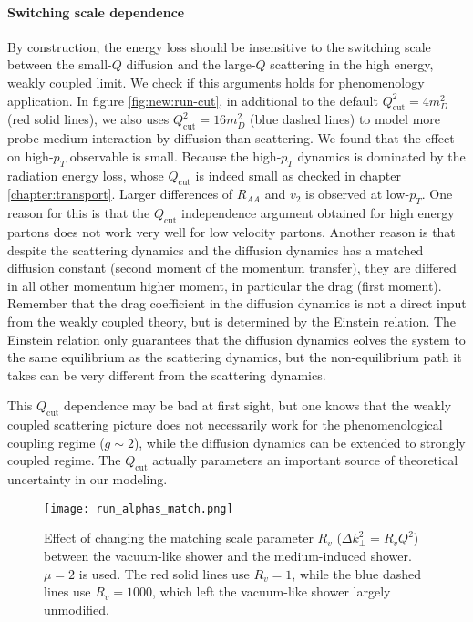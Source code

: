 \paragraph{Switching scale dependence} By construction, the energy loss should be insensitive to the switching scale between the small-$Q$ diffusion and the large-$Q$ scattering in the high energy, weakly coupled limit.
We check if this arguments holds for phenomenology application.
In figure \ref{fig:new:run-cut}, in additional to the default $Q_\textrm{cut}^2 = 4 m_D^2$ (red solid lines), we also uses $Q_\textrm{cut}^2 = 16 m_D^2$ (blue dashed lines) to model more probe-medium interaction by diffusion than scattering.
We found that the effect on high-$p_T$ observable is small.
Because the high-$p_T$ dynamics is dominated by the radiation energy loss, whose $Q_\textrm{cut}$ is indeed small as checked in chapter \ref{chapter:transport}.
Larger differences of $R_{AA}$ and $v_2$ is observed at low-$p_T$.
One reason for this is that the $Q_\textrm{cut}$ independence argument obtained for high energy partons does not work very well for low velocity partons.
Another reason is that despite the scattering dynamics and the diffusion dynamics has a matched diffusion constant (second moment of the momentum transfer), they are differed in all other momentum higher moment, in particular the drag (first moment).
Remember that the drag coefficient in the diffusion dynamics is not a direct input from the weakly coupled theory, but is determined by the Einstein relation.
The Einstein relation only guarantees that the diffusion dynamics eolves the system to the same equilibrium as the scattering dynamics, but the non-equilibrium path it takes can be very different from the scattering dynamics.

This $Q_\textrm{cut}$ dependence may be bad at first sight, but one knows that the weakly coupled scattering picture does not necessarily work for the phenomenological coupling regime ($g\sim 2$), while the diffusion dynamics can be extended to strongly coupled regime.
The $Q_\textrm{cut}$ actually parameters an important source of theoretical uncertainty in our modeling.

\begin{figure}
\centering
\texttt{[image: run\_alphas\_match.png]}
\caption{Effect of changing the matching scale parameter $R_v$ ($\Delta k_\perp^2 = R_v Q^2$) between the vacuum-like shower and the medium-induced shower. $\mu=2$ is used. The red solid lines use $R_v =1$, while the blue dashed lines use $R_v = 1000$, which left the vacuum-like shower largely unmodified.}
\label{fig:new:run-match}
\end{figure}

